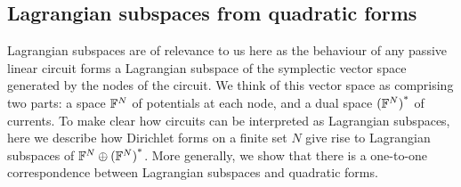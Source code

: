 \subsection{Lagrangian subspaces from quadratic forms}

Lagrangian subspaces are of relevance to us here as the behaviour of any passive
linear circuit forms a Lagrangian subspace of the symplectic vector space
generated by the nodes of the circuit. We think of this vector space as
comprising two parts: a space ${\mathbb F}^N$ of potentials at each node, and a dual
space ${({\mathbb F}^N)}^\ast$ of currents. To make clear how circuits can be interpreted
as Lagrangian subspaces, here we describe how Dirichlet forms on a finite set
$N$ give rise to Lagrangian subspaces of ${{\mathbb F}^{N} \oplus {({\mathbb F}^{N})}^\ast}$. More generally, we show
that there is a one-to-one correspondence between Lagrangian subspaces and
quadratic forms.

